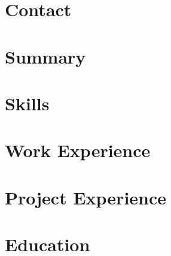 \documentclass{my_cv}
\begin{document}
\section{Contact}
\section{Summary}
\section{Skills}
\section{Work Experience}
\section{Project Experience}
\section{Education}
\end{document}
